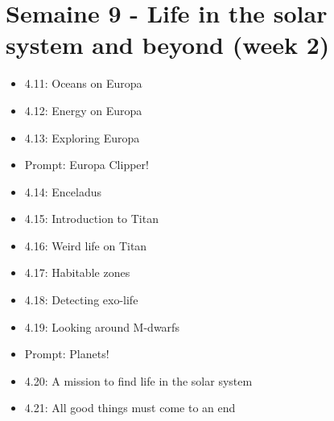 \newpage 

\section*{Semaine 9 - Life in the solar system and beyond (week 2)}

\begin{itemize}[label={$\bullet$}]
    \item 4.11: Oceans on Europa
    \item 4.12: Energy on Europa
    \item 4.13: Exploring Europa
    \item Prompt: Europa Clipper!
    \item 4.14: Enceladus
    \item 4.15: Introduction to Titan
    \item 4.16: Weird life on Titan
    \item 4.17: Habitable zones
    \item 4.18: Detecting exo-life
    \item 4.19: Looking around M-dwarfs
    \item Prompt: Planets!
    \item 4.20: A mission to find life in the solar system
    \item 4.21: All good things must come to an end 
\end{itemize}


\newpage 


